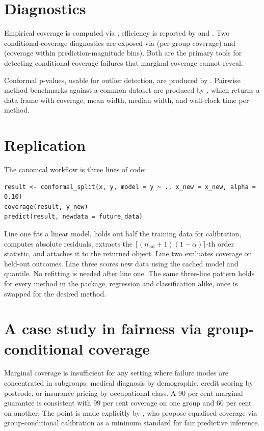 \section{Diagnostics}\label{diagnostics}

Empirical coverage is computed via ; efficiency
is reported by  and .
Two conditional-coverage diagnostics are exposed via
 (per-group coverage) and
 (coverage within prediction-magnitude
bins). Both are the primary tools for detecting conditional-coverage
failures that marginal coverage cannot reveal.

Conformal p-values, usable for outlier detection, are produced by
. Pairwise method benchmarks against a
common dataset are produced by , which
returns a data frame with coverage, mean width, median width, and
wall-clock time per method.

\section{Replication}\label{replication}

The canonical workflow is three lines of code:

\begin{verbatim}
result <- conformal_split(x, y, model = y ~ ., x_new = x_new, alpha = 0.10)
coverage(result, y_new)
predict(result, newdata = future_data)
\end{verbatim}

Line one fits a linear model, holds out half the training data for
calibration, computes absolute residuals, extracts the
\(\lceil(n_{\text{cal}}+1)(1-\alpha)\rceil\)-th order statistic, and attaches
it to the returned object. Line two evaluates coverage on held-out
outcomes. Line three scores new data using the cached model and quantile.
No refitting is needed after line one. The same three-line pattern holds
for every method in the package, regression and classification alike, once
 is swapped for the desired method.

\section{A case study in fairness via group-conditional coverage}\label{a-case-study-in-fairness-via-group-conditional-coverage}

Marginal coverage is insufficient for any setting where failure modes are
concentrated in subgroups: medical diagnosis by demographic, credit scoring
by postcode, or insurance pricing by occupational class. A 90 per cent
marginal guarantee is consistent with 99 per cent coverage on one group and
60 per cent on another. The point is made explicitly by
\citet{romano2020malice}, who propose equalised coverage via group-conditional
calibration as a minimum standard for fair predictive inference.

